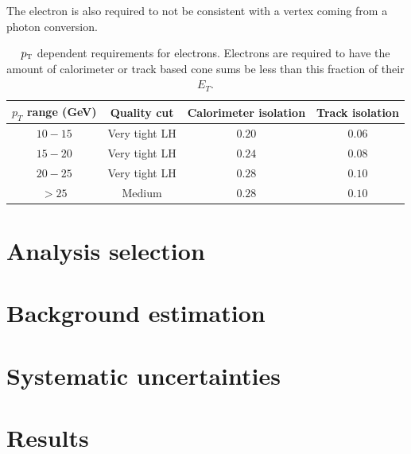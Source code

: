 The electron is also required to not be consistent with a vertex coming from a photon conversion. 


\begin{table}[h!]
\centering
\captionsetup{justification=centering}

\hspace{-10pt}
\begin{tabular}{|c|c|c|c|}
\hline
$p_T$ range (GeV) & Quality cut & Calorimeter isolation & Track isolation\\ \hline \hline
$10-15$ & Very tight LH & $0.20$ & $0.06$ \\ \hline
$15-20$ & Very tight LH & $0.24$ & $0.08$ \\ \hline
$20-25$ & Very tight LH & $0.28$ & $0.10$ \\ \hline
$> 25$ & Medium & $0.28$ & $0.10$ \\ \hline
\end{tabular}

\caption{
$p_{\textrm{\footnotesize\sc t}}$ dependent requirements for electrons. Electrons are required to have the amount of calorimeter or track based cone sums be less than this fraction of their $E_{T}$.
}
\label{tab:elecselec}
\end{table}




\section{Analysis selection}

\section{Background estimation}
\label{sec:HWWbkg}

\section{Systematic uncertainties}

\section{Results}
